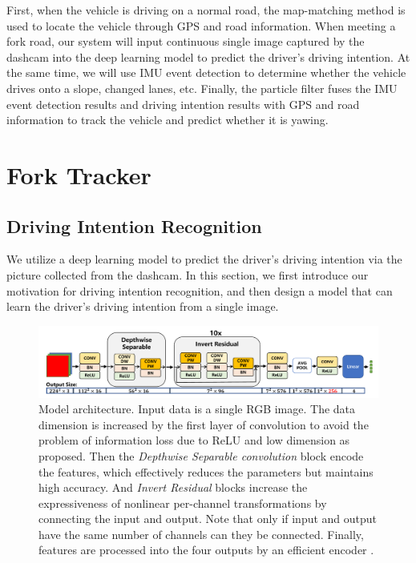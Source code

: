 \documentclass[journal]{IEEEtran}
\begin{document}
First, when the vehicle is driving on a normal road, the map-matching method is used to locate the vehicle through GPS and road information. When meeting a fork road, our system will input continuous single image captured by the dashcam into the deep learning model to predict the driver's driving intention. At the same time, we will use IMU event detection to determine whether the vehicle drives onto a slope, changed lanes, etc. Finally, the particle filter fuses the IMU event detection results and driving intention results with GPS and road information to track the vehicle and predict whether it is yawing. 

\section{Fork Tracker}
\subsection{Driving Intention Recognition}\label{sec:image}
We utilize a deep learning model to predict the driver's driving intention via the picture collected from the dashcam.
In this section, we first introduce our motivation for driving intention recognition, and then design a model that can learn the driver's driving intention from a single image.


\begin{figure}[htbp]
    \centerline{\includegraphics[width=1\textwidth]{fig/net.pdf}}
    \caption{Model architecture. Input data is a single RGB image. The data dimension is increased by the first layer of convolution to avoid the problem of information loss due to ReLU and low dimension as \cite{mobilenetv2} proposed. Then the \textit{Depthwise Separable convolution} \cite{howard2017mobilenets} block encode the features, which effectively reduces the parameters but maintains high accuracy. And \textit{Invert Residual} \cite{mobilenetv2} blocks increase the expressiveness of nonlinear per-channel transformations by connecting the input and output. Note that only if input and output have the same number of channels can they be connected. Finally, features are processed into the four outputs by an efficient encoder \cite{mobilenetv3}. }
    \label{fig:net}
\end{figure}
 
\end{document}
